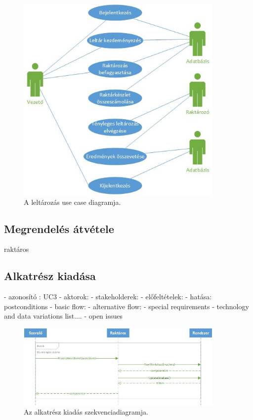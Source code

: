 \documentclass[11pt]{article}\usepackage[left=20mm,right=20mm,top=15mm,bottom=20mm]{geometry}
\begin{document}
\begin{figure}[!h]
    \centering
        \includegraphics[width=0.9\textwidth]{figures/leltarazas_UC.jpg}
        \caption{A leltározás use case diagramja.}
\end{figure}

\subsection{Megrendelés átvétele}
raktáros

\subsection{Alkatrész kiadása}
- azonosító : UC3
- aktorok: 
- stakeholderek:
- előfeltételek:
- hatása: postconditions
- basic flow:
- alternative flow:
- special requirements
- technology and data variations list.... 
- open issues

\begin{figure}[!h]
    \centering
        \includegraphics[width=0.9\textwidth]{figures/alkatresz_kiadas_SD.jpg}
        \caption{Az alkatrész kiadás szekvenciadiagramja.}
\end{figure}
\end{document}
